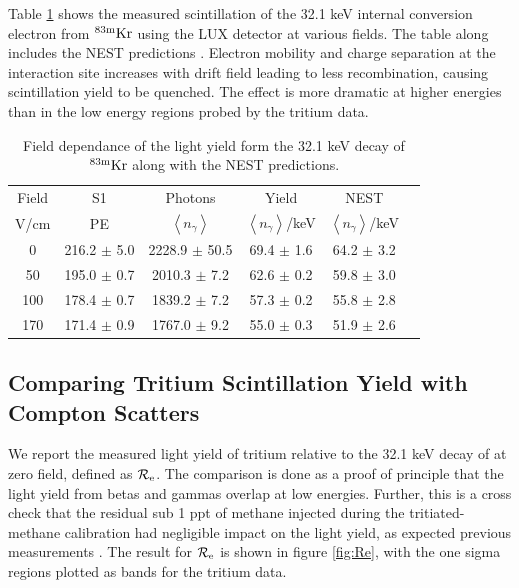 Table \ref{table:kr32} shows the measured scintillation of the 32.1 keV internal conversion electron from $\rm ^{83m}Kr$ using the LUX detector at various fields. The table along includes the NEST predictions \cite{NEST_2013}. Electron mobility and charge separation at the interaction site increases with drift field leading to less recombination, causing scintillation yield to be quenched. The effect is more dramatic at higher energies than in the low energy regions probed by the tritium data.

\renewcommand{\baselinestretch}{1}
\small\normalsize
\begin{table}[h!]
\begin{center}
\begin{tabular}{|c|c|c|c|c|c|}
\hline
Field	&S1			& Photons						& Yield 								&NEST	 \\
V/cm	& PE					& $\left<n_{\gamma}\right>$		& $\left<n_{\gamma}\right>$/keV	& $\left<n_{\gamma}\right>$/keV \\ \hline
0 		&	216.2 $\pm$ 5.0 	&2228.9 $\pm$ 50.5 &	69.4 $\pm$	1.6 	&	64.2 $\pm$ 3.2  \\ \hline
50 		&	195.0 $\pm$ 0.7 	&2010.3 $\pm$ 7.2   & 	62.6 $\pm$	0.2	&	59.8 $\pm$ 3.0 \\ \hline
100 	&	178.4 $\pm$ 0.7 	&1839.2 $\pm$ 	7.2	 &	57.3 $\pm$ 0.2 	&	55.8 $\pm$ 2.8 \\ \hline
170 	&  171.4 $\pm$ 0.9		&1767.0 $\pm$ 	9.2  &	55.0 $\pm$ 0.3 	&	51.9 $\pm$ 2.6 \\ \hline
\end{tabular}
\caption{Field dependance of the light yield form the 32.1 keV decay of $\rm^{83m}Kr$ along with the NEST \cite{NEST_2013} predictions.}
\label{table:kr32}
\end{center}
\end{table}
\renewcommand{\baselinestretch}{2}
\small\normalsize


\subsection{Comparing Tritium Scintillation Yield with Compton Scatters}

We report the measured light yield of tritium relative to the 32.1 keV decay of \KrCal at zero field, defined as $\rm \mathcal{R}_e$. The comparison is done as a proof of principle that the light yield from betas and gammas overlap at low energies. Further, this is a cross check that the residual sub 1 ppt of methane injected during the tritiated-methane calibration had negligible impact on the light yield, as expected previous measurements \cite{Kirill_Methane}. The result for $\rm \mathcal{R}_e$ is shown in figure \ref{fig:Re}, with the one sigma regions plotted as bands for the tritium data.


